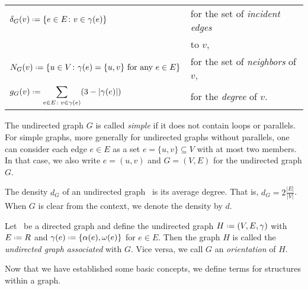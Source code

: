 \begin{tabular}{ll}
	$\delta_G(v) \defeq \left \{e \in E \colon v \in \gamma(e) \right \}$ & for the set of \textit{incident edges}\\
	&to $v$,\\
	$N_G(v) \defeq \left \{ u \in V \colon \gamma(e) = \{u, v\} \text{ for any } e \in E \right \}$ & for the set of \textit{neighbors} of $v$, \\
	$g_G(v) \defeq \displaystyle \sum_{e \in E \colon v \in \gamma(e)} (3 - |\gamma(e)|)$ & for the \textit{degree} of $v$.
\end{tabular}\vspace{1em}

The undirected graph $G$ is called \textit{simple} if it does not contain loops or parallels. For simple graphs, more generally for undirected graphs without parallels, one can consider each edge $e \in E$ as a set $e = \{u, v\} \subseteq V$ with at most two members. In that case, we also write $e = (u, v)$ and $G = (V, E)$ for the undirected graph $G$.

\begin{definition}[Density]
	\label{def:density}
	The density $d_G$ of an undirected graph \ugraph\ is its average degree. That is, $d_G = 2\frac{|E|}{|V|}$. When $G$ is clear from the context, we denote the density by $d$.
\end{definition}

\begin{definition}
	\label{def:orientation}
	Let \graph\ be a directed graph and define the undirected graph $H \defeq (V, E, \gamma)$ with $E \defeq R$ and $\gamma(e) \defeq \{ \alpha(e), \omega(e) \}$ for $e \in E$. Then the graph $H$ is called the \textit{undirected graph associated} with $G$. Vice versa, we call $G$ an \textit{orientation} of $H$.
\end{definition}

Now that we have established some basic concepts, we define terms for structures within a graph. 


